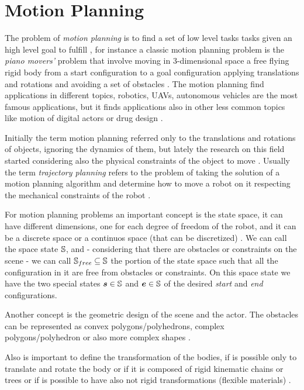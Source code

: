\documentclass[dissertation.tex]{subfiles}
\begin{document}
\chapter{Motion Planning}
The problem of \emph{motion planning} is to find a set of
low level tasks tasks given an high level goal to fulfill
\cite{choset}, for instance a classic motion planning problem is the
\emph{piano movers'} problem that involve moving in 3-dimensional space
a free flying rigid 
body from a start configuration to a goal configuration applying
translations and rotations and avoiding a set
of obstacles \cite{choset}\cite{lavalle}. The motion planning find
applications in 
different topics, robotics, \acp{UAV}, autonomous vehicles are the most
famous applications, but it finds applications also in other less
common topics like motion of digital actors or drug design
\cite{choset}.

Initially the term motion planning referred only to the translations
and rotations of objects, ignoring the dynamics of them, but lately
the research on this field started considering also the physical
constraints of the object to move \cite{lavalle}. Usually the term
\emph{trajectory planning} refers to the problem of taking the
solution of a
motion planning algorithm and determine how to move a robot on it
respecting the mechanical constraints of the robot \cite{lavalle}.

For motion planning problems an important concept is the state space,
it can have different dimensions, one for each degree of freedom of
the robot, and it can be a discrete space or a continuos space (that
can be discretized) \cite{lavalle}. We can call the space state $\mathbb{S}$,
and - considering that there are obstacles or constraints on the scene
- we can call $\mathbb{S}_{free}\subseteq\mathbb{S}$
the portion of the state space such that all the configuration in it
are free from obstacles or constraints. On this space state we have
the two special states $\boldsymbol{s}\in\mathbb{S}$ and $\boldsymbol{e}\in\mathbb{S}$ of the
desired \emph{start} and \emph{end} configurations.

Another concept is the geometric design of the scene and the
actor. The obstacles can be represented as convex
polygons/polyhedrons, complex polygons/polyhedron or also more complex
shapes \cite{lavalle}.

Also is important to define the transformation of the bodies, if is
possible only to translate and rotate the body or if it is composed of
rigid kinematic chains or trees or if is possible to have also not
rigid transformations (flexible materials) \cite{lavalle}.
\end{document}
